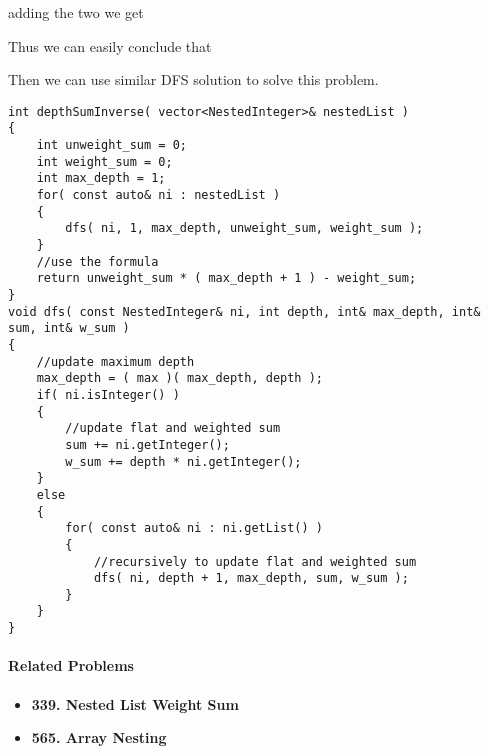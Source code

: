 

adding the two we get


Thus we can easily conclude that


Then we can use similar DFS solution to solve this problem.

\setcounter{lstlisting}{0}
\begin{lstlisting}[style=customc, caption={DFS}]
int depthSumInverse( vector<NestedInteger>& nestedList )
{
    int unweight_sum = 0;
    int weight_sum = 0;
    int max_depth = 1;
    for( const auto& ni : nestedList )
    {
        dfs( ni, 1, max_depth, unweight_sum, weight_sum );
    }
    //use the formula
    return unweight_sum * ( max_depth + 1 ) - weight_sum;
}
void dfs( const NestedInteger& ni, int depth, int& max_depth, int& sum, int& w_sum )
{
    //update maximum depth
    max_depth = ( max )( max_depth, depth );
    if( ni.isInteger() )
    {
        //update flat and weighted sum
        sum += ni.getInteger();
        w_sum += depth * ni.getInteger();
    }
    else
    {
        for( const auto& ni : ni.getList() )
        {
            //recursively to update flat and weighted sum
            dfs( ni, depth + 1, max_depth, sum, w_sum );
        }
    }
}
\end{lstlisting}

\paragraph{Related Problems}
\begin{itemize}
\item \textbf{339. Nested List Weight Sum}
\item \textbf{565. Array Nesting}
\end{itemize}

